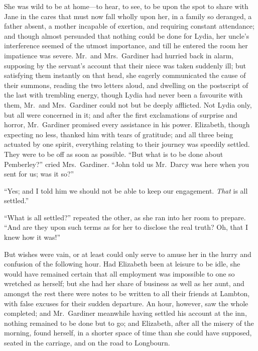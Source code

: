She was wild to be at home---to hear, to see, to be upon the
spot to share with Jane in the cares that must now fall wholly
upon her, in a family so deranged, a father absent, a mother
incapable of exertion, and requiring constant attendance; and
though almost persuaded that nothing could be done for Lydia,
her uncle's interference seemed of the utmost importance, and
till he entered the room her impatience was severe.  Mr.\ and
Mrs.\ Gardiner had hurried back in alarm, supposing by the
servant's account that their niece was taken suddenly ill; but
satisfying them instantly on that head, she eagerly communicated
the cause of their summons, reading the two letters aloud, and
dwelling on the postscript of the last with trembling energy,
though Lydia had never been a favourite with them, Mr.\ and
Mrs.\ Gardiner could not but be deeply afflicted.  Not Lydia
only, but all were concerned in it; and after the first
exclamations of surprise and horror, Mr.\ Gardiner promised
every assistance in his power.  Elizabeth, though expecting no
less, thanked him with tears of gratitude; and all three being
actuated by one spirit, everything relating to their journey was
speedily settled.  They were to be off as soon as possible.  ``But
what is to be done about Pemberley?'' cried Mrs.\ Gardiner.
``John told us Mr.\ Darcy was here when you sent for us; was it
so?''

``Yes; and I told him we should not be able to keep our
engagement.  \emph{That} is all settled.''

``What is all settled?'' repeated the other, as she ran into her
room to prepare.  ``And are they upon such terms as for her to
disclose the real truth?  Oh, that I knew how it was!''

But wishes were vain, or at least could only serve to amuse her
in the hurry and confusion of the following hour.  Had Elizabeth
been at leisure to be idle, she would have remained certain that
all employment was impossible to one so wretched as herself;
but she had her share of business as well as her aunt, and
amongst the rest there were notes to be written to all their
friends at Lambton, with false excuses for their sudden
departure.  An hour, however, saw the whole completed; and
Mr.\ Gardiner meanwhile having settled his account at the inn,
nothing remained to be done but to go; and Elizabeth, after all
the misery of the morning, found herself, in a shorter space of
time than she could have supposed, seated in the carriage, and
on the road to Longbourn.



